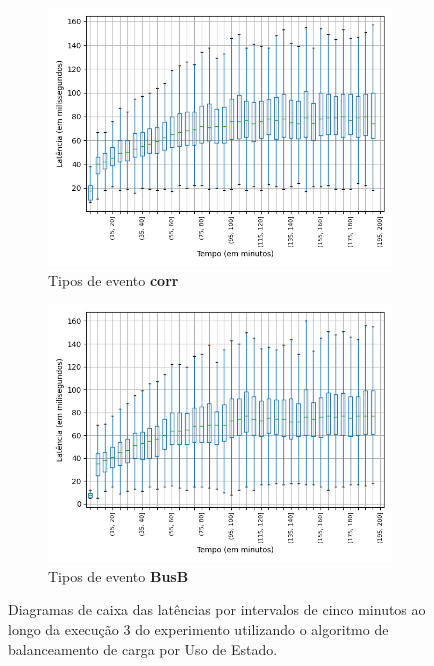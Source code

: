 \begin{figure}
\begin{subfigure}{.5\textwidth}
\centering
\includegraphics[width=\textwidth]{figuras/graphics/boxplot_8-dez-su_corr.png}
\caption{Tipos de evento \textbf{corr}}
\label{fig:BoxPlot_corr_SU_8-dez-su}
\end{subfigure}%
\begin{subfigure}{.5\textwidth}
\centering
\includegraphics[width=\textwidth]{figuras/graphics/boxplot_8-dez-su_busb.png}
\caption{Tipos de evento \textbf{BusB}}
\label{fig:BoxPlot_BusB_SU_8-dez-su}
\end{subfigure}%
\caption{Diagramas de caixa das latências por intervalos de cinco minutos ao longo da execução 3 do experimento utilizando o algoritmo de balanceamento de carga por Uso de Estado.}
\end{figure}






